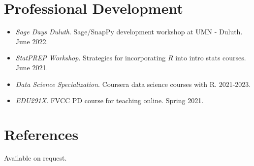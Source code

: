\documentclass[12pt]{article}
\begin{document}
\section{Professional Development}

\begin{itemize}

\item \textit{Sage Days Duluth}. Sage/SnapPy development workshop at UMN - Duluth.  June 2022. 

\item \textit{StatPREP Workshop}. Strategies for incorporating $R$ into intro stats courses. June 2021.

\item \textit{Data Science Specialization}. Coursera data science courses with R. 2021-2023. 

\item \textit{EDU291X}. FVCC PD course for teaching online. Spring 2021. 

\end{itemize}

\section{References}
Available on request. 
\end{document}
